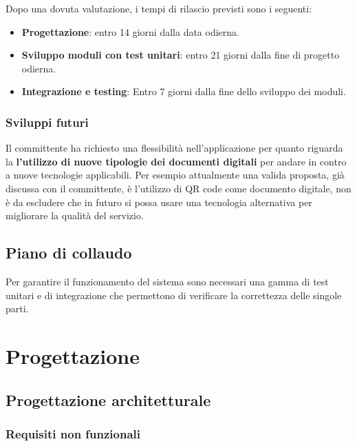\documentclass[a4paper]{article}
\begin{document}
Dopo una dovuta valutazione, i tempi di rilascio previsti sono i seguenti:

\begin{itemize}
    \item \textbf{Progettazione}: entro 14 giorni dalla data odierna.
    \item \textbf{Sviluppo moduli con test unitari}: entro 21 giorni dalla fine di progetto odierna.
    \item \textbf{Integrazione e testing}: Entro 7 giorni dalla fine dello sviluppo dei moduli.
\end{itemize}

\subsubsection{Sviluppi futuri}

Il committente ha richiesto una flessibilità nell'applicazione per quanto riguarda la \textbf{l'utilizzo di nuove tipologie dei documenti digitali} per andare in contro a nuove tecnologie applicabili. Per esempio attualmente una valida proposta, già discussa con il committente, è l'utilizzo di QR code come documento digitale, non è da escludere che in futuro si possa usare una tecnologia alternativa per migliorare la qualità del servizio.   

\newpage

\subsection{Piano di collaudo}

Per garantire il funzionamento del sistema sono necessari una gamma di test unitari e
di integrazione che permettono di verificare la correttezza delle singole parti.





\newpage

\section{Progettazione}

\subsection{Progettazione architetturale}

\subsubsection{Requisiti non funzionali}
\end{document}
